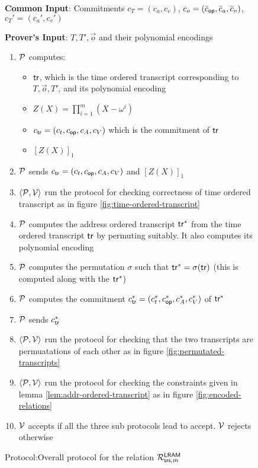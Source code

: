 \begin{figure}[htbp]

    \begin{mdframed}
    {
            {\bf Common Input}: Commitments $c_T=(c_a,c_v)$, $c_o=(\bar{c}_{\mathsf{op}}, \bar{c}_a, \bar{c}_v)$, $c_T'=(c_a', c_v')$

            {\bf Prover's Input}: $ T, T', \vec{o}$ and their polynomial encodings
        \begin{enumerate}[leftmargin=1em, label=\arabic*.]
            \item $\mathcal{P}$ computes:
            \begin{itemize}
                \item $\mathsf{tr}$, which is the time ordered transcript corresponding to $T, \vec{o}, T'$, and its polynomial encoding
                \item $Z(X)=\prod_{i=1}^m (X-\omega^i)$
                \item $c_{\mathsf{tr}}=(c_t, c_{\mathsf{op}}, c_A, c_V)$ which is the commitment of $\mathsf{tr}$
                \item $[Z(X)]_1$
            \end{itemize}

            \item $\mathcal{P}$ sends  $c_{\mathsf{tr}}=(c_t, c_{\mathsf{op}}, c_A, c_V)$ and $[Z(X)]_1$
            \item $\left<\mathcal{P}, \mathcal{V} \right>$ run the protocol for checking correctness of time ordered transcript as in figure \ref{fig:time-ordered-transcript}
            \item $\mathcal{P}$ computes the address ordered transcript $\mathsf{tr}^{*}$ from the time ordered transcript $\mathsf{tr}$ by permuting suitably. It also computes its polynomial encoding
            \item $\mathcal{P}$ computes the permutation $\sigma$ such that $\mathsf{tr}^{*}= \sigma(\mathsf{tr})$ (this is computed along with the $\mathsf{tr}^{*}$)
            \item $\mathcal{P}$ computes the commitment $c_{\mathsf{tr}}^\ast=(c_t^\ast,c_{\mathsf{op}}^\ast, c_A^\ast, c_V^\ast)$ of $\mathsf{tr}^{*}$
            \item $\mathcal{P}$ sends  $c_{\mathsf{tr}}^\ast$
            \item $\left<\mathcal{P}, \mathcal{V} \right>$ run the protocol for checking that the two transcripts are permuatations of each other as in figure \ref{fig:permutated-transcripts}
            \item $\left<\mathcal{P}, \mathcal{V} \right>$ run the protocol for checking the constraints given in lemma \ref{lem:addr-ordered-transcript} as in figure \ref{fig:encoded-relations}
            \item $\mathcal{V}$ accepts if all the three sub protocols lead to accept. $\mathcal{V}$ rejects otherwise
        \end{enumerate}
    }
    \end{mdframed}
    \caption{Protocol:Overall protocol for the relation $\mathcal{R}^{\mathsf{LRAM}}_{\mathsf{srs},m}$}
    \label{fig:covering-protocol}
\end{figure}

